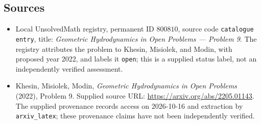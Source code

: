 \documentclass[11pt]{article}
\begin{document}
\subsection{Sources}
\begin{itemize}
\item Local UnsolvedMath registry, permanent ID \(800810\), source code \texttt{catalogue entry}, title: \emph{Geometric Hydrodynamics in Open Problems --- Problem 9}. The registry attributes the problem to Khesin, Misiolek, and Modin, with proposed year 2022, and labels it \texttt{open}; this is a supplied status label, not an independently verified assessment.
\item Khesin, Misiolek, Modin, \emph{Geometric Hydrodynamics in Open Problems} (2022), Problem 9. Supplied source URL: \url{https://arxiv.org/abs/2205.01143}. The supplied provenance records access on 2026-10-16 and extraction by \texttt{arxiv\_latex}; these provenance claims have not been independently verified.
\end{itemize}
\end{document}
